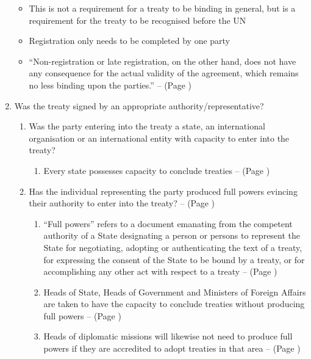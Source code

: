 \begin{enumerate}
\begin{itemize}
        \item This is not a requirement for a treaty to be binding in general, but is a requirement for the treaty to be recognised before the UN
        \item Registration only needs to be completed by one party
        \item ``Non-registration or late registration, on the other hand, does not have any consequence for the actual validity of the agreement, which remains no less binding upon the parties.'' --  (Page \pageref{case:Qatar v Bahrain})
    \end{itemize}
    \item Was the treaty signed by an appropriate authority/representative?
    \begin{enumerate}
        \item Was the party entering into the treaty a state, an international organisation or an international entity with capacity to enter into the treaty?
        \begin{enumerate}
            \item Every state possesses capacity to conclude treaties --  (Page \pageref{VCLT Art 6})
        \end{enumerate}
        \item Has the individual representing the party produced full powers evincing their authority to enter into the treaty? --  (Page \pageref{VCLT Art 2})
        \begin{enumerate}
            \item ``Full powers'' refers to a document emanating from the competent authority of a State designating a person or persons to represent the State for negotiating, adopting or authenticating the text of a treaty, for expressing the consent of the State to be bound by a treaty, or for accomplishing any other act with respect to a treaty --  (Page \pageref{VCLT Art 2})
            \item Heads of State, Heads of Government and Ministers of Foreign Affairs are taken to have the capacity to conclude treaties without producing full powers --  (Page \pageref{VCLT Art 2})
            \item Heads of diplomatic missions will likewise not need to produce full powers if they are accredited to adopt treaties in that area --  (Page \pageref{VCLT Art 2})

\end{enumerate}
\end{enumerate}
\end{enumerate}

